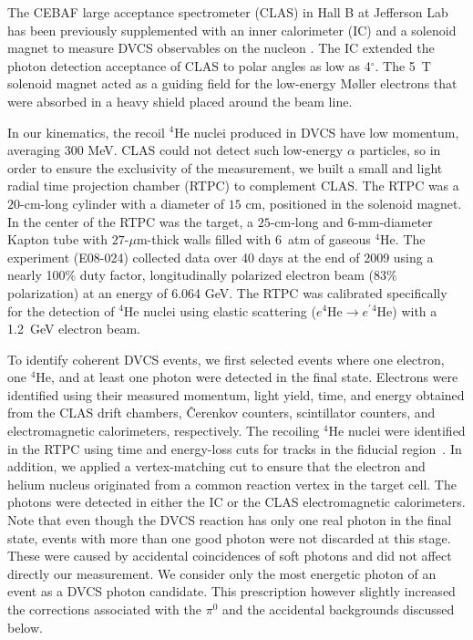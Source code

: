 \documentclass[twocolumn,nofootinbib,showpacs,prl,superscriptaddress,secnumarabic,amssymb,nobibnotes,aps,floatfix]{revtex4}
\begin{document}
The CEBAF large acceptance spectrometer (CLAS) in Hall B at Jefferson 
Lab~\cite{Mecking:2003zu} has been previously supplemented with an inner 
calorimeter (IC) and a solenoid magnet to measure DVCS observables on the nucleon
\cite{Girod:2007aa,Gavalian:2009,Seder:2015,Pisano:2015,Jo:2015ema}. The IC 
extended the photon detection acceptance of CLAS to polar angles as low as 
4$^{\circ}$. The 5~T solenoid magnet acted as a guiding field for the 
low-energy M\o{}ller electrons that were absorbed in a  
heavy shield placed around the beam line. 

In our kinematics, the recoil $^4$He nuclei produced in DVCS have low momentum,
averaging 300 MeV. CLAS could not detect such low-energy $\alpha$ 
particles, so in order to ensure the exclusivity of the measurement, we built a 
small and light radial time projection chamber (RTPC) to complement CLAS. The 
RTPC was a $20$-cm-long cylinder with a diameter of $15$ cm, positioned in the 
solenoid magnet. In the center of the RTPC was the target, a $25$-cm-long 
and $6$-mm-diameter Kapton tube with $27$-$\mu$m-thick walls filled with 
6~atm of gaseous $^4$He. The experiment (E08-024) collected
data over 40 days at the end of 2009 using a 
nearly 100\% duty factor, longitudinally polarized electron beam (83$\%$ 
polarization) at an energy of 6.064 GeV. The RTPC was calibrated specifically 
for the detection of $^4$He nuclei using elastic scattering 
($e^4$He$\to e^\prime$$^4$He) with a 1.2~GeV electron beam.

To identify coherent DVCS events, we first selected events where one electron, 
one $^4$He, and at least one photon were detected in the final state. Electrons 
were identified using their measured momentum, light yield, time, and energy obtained from 
the CLAS drift chambers, \^{C}erenkov counters, scintillator counters, 
and electromagnetic calorimeters, respectively. The recoiling $^4$He nuclei 
were identified in the RTPC using time and energy-loss cuts for tracks in the 
fiducial region~\cite{Hattawy:thesis}. In addition, we applied a vertex-matching 
cut to ensure that the 
electron and helium nucleus originated from a common reaction vertex in the 
target cell. The photons were 
detected in either the IC or the CLAS electromagnetic calorimeters. Note that 
even though the DVCS reaction has only one real photon in the final state, 
events with more than one good photon were not discarded at this stage. These
were caused by accidental coincidences of soft photons and did not affect 
directly our measurement. We consider only the most energetic photon of an 
event as a DVCS photon candidate.
This prescription however slightly increased the corrections associated with
the $\pi^0$ and the accidental backgrounds discussed below. 
\end{document}
